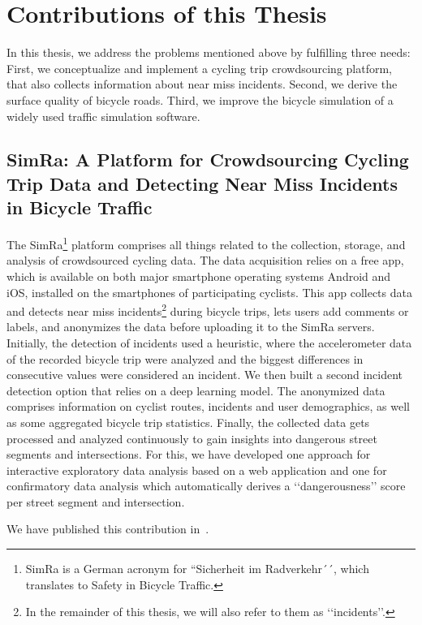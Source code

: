 \section{Contributions of this Thesis}
\label{sec:contributions}
In this thesis, we address the problems mentioned above by fulfilling three needs:
First, we conceptualize and implement a cycling trip crowdsourcing platform, that also collects information about near miss incidents.
Second, we derive the surface quality of bicycle roads.
Third, we improve the bicycle simulation of a widely used traffic simulation software.

\subsection{SimRa: A Platform for Crowdsourcing Cycling Trip Data and Detecting Near Miss Incidents in Bicycle Traffic}
\label{subsec:simra_contribution}
The SimRa\footnote{SimRa is a German acronym for ``Sicherheit im Radverkehr´´, which translates to Safety in Bicycle Traffic.} platform comprises all things related to the collection, storage, and analysis of crowdsourced cycling data.
The data acquisition relies on a free app, which is available on both major smartphone operating systems Android and iOS, installed on the smartphones of participating cyclists.
This app collects data and detects near miss incidents\footnote{In the remainder of this thesis, we will also refer to them as ‘‘incidents’’.} during bicycle trips, lets users add comments or labels, and anonymizes the data before uploading it to the SimRa servers.
Initially, the detection of incidents used a heuristic, where the accelerometer data of the recorded bicycle trip were analyzed and the biggest differences in consecutive values were considered an incident.
We then built a second incident detection option that relies on a deep learning model.
The anonymized data comprises information on cyclist routes, incidents and user demographics, as well as some aggregated bicycle trip statistics.
Finally, the collected data gets processed and analyzed continuously to gain insights into dangerous street segments and intersections.
For this, we have developed one approach for interactive exploratory data analysis based on a web application and one for confirmatory data analysis which automatically derives a ‘‘dangerousness’’ score per street segment and intersection. 

We have published this contribution in~\cite{karakaya2020simra,karakaya2022cyclesense}.

